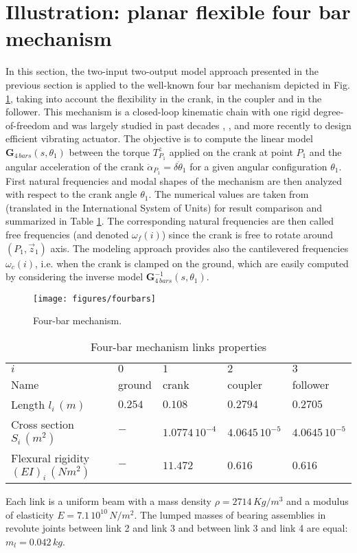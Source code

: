\section{Illustration: planar flexible four bar mechanism}\label{sect:fb}
In this section, the two-input two-output model approach presented in the previous section is applied to the well-known four bar mechanism depicted in Fig. \ref{fig:4bars}, taking into account the flexibility in the crank, in the coupler and in the follower. This mechanism is a closed-loop kinematic chain with one rigid degree-of-freedom and was largely studied in past decades \cite{Kitis1990267},  \cite{shigley1980}, \cite{Turcic1984} and more recently \cite{Sitti2003} to design efficient vibrating actuator. The objective is to compute the linear model $\mathbf{G}_{4\,bars}(s,\theta_1)$ between the torque $T^z_{P_1}$  applied on the crank at point $P_1$ and the angular acceleration of the crank $\ddot{\alpha}_{P_1}=\delta\ddot{\theta}_1$ for a given angular configuration $\theta_1$. First natural frequencies and modal shapes of the mechanism are then analyzed with respect to the crank angle $\theta_1$. The numerical values are taken from  \cite{Kitis1990267} (translated in the International System of Units) for result comparison and summarized in Table \ref{tab:data}.
The corresponding natural frequencies are then called free frequencies (and denoted $\omega_f(i)$) since the crank is free to rotate around $(P_1,\vec{z}_1)$ axis. The modeling approach provides also the cantilevered frequencies  $\omega_c(i)$, i.e. when the crank is clamped on the ground, which are easily computed by considering the inverse model $\mathbf{G}_{4\,bars}^{-1}(s,\theta_1)$.

\begin{figure}[htbp!]
  \texttt{[image: figures/fourbars]}
\caption{Four-bar mechanism.}
\label{fig:4bars} 
\end{figure}

\begin{table}[htbp!]
\caption{Four-bar mechanism links properties}
\label{tab:data}       %
\begin{tabular}{lllll}
\hline\noalign{\smallskip}
  $i$ & $0$ &  $1$ &  $2$ &  $3$  \\
\noalign{\smallskip}\hline\noalign{\smallskip}
Name & ground & crank & coupler & follower \\ 
Length $l_i\,(m)$ & $0.254$ & $0.108$ & $0.2794$ & $0.2705$\\
Cross section $S_i\,(m^2)$ & $-$ & $1.0774\,10^{-4}$ & $4.0645\,10^{-5}$ & $4.0645\,10^{-5}$ \\
Flexural rigidity $(EI)_i\,(Nm^2)$ & $-$ & $11.472$ & $0.616$ & $0.616$ \\
\hline
\end{tabular}
Each link is a uniform beam with a mass density $\rho=2714\,Kg/m^3$ and a modulus of elasticity $E=7.1\,10^{10}\,N/m^2$. The lumped masses of bearing assemblies in revolute joints between link 2 and link 3 and between link 3 and link 4 are equal: $m_l=0.042\,kg$.
\end{table}

